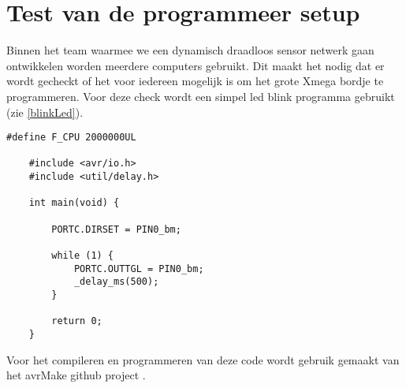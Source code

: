 \section{Test van de programmeer setup}

Binnen het team waarmee we een dynamisch draadloos sensor netwerk gaan ontwikkelen worden meerdere computers gebruikt. Dit maakt het nodig dat er wordt gecheckt of het voor iedereen mogelijk is om het grote Xmega bordje te programmeren. Voor deze check wordt een simpel led blink programma gebruikt (zie \autoref{blinkLed}).


\begin{lstlisting}[caption={blink.c},captionpos=b,label={blinkLed},style=c]
    #define F_CPU 2000000UL

    #include <avr/io.h>
    #include <util/delay.h>
    
    int main(void) {
    
        PORTC.DIRSET = PIN0_bm;
    
        while (1) {
            PORTC.OUTTGL = PIN0_bm;
            _delay_ms(500);
        }
        
        return 0;
    }
\end{lstlisting}

Voor het compileren en programmeren van deze code wordt gebruik gemaakt van het avrMake github project \autocite{avrMake}.